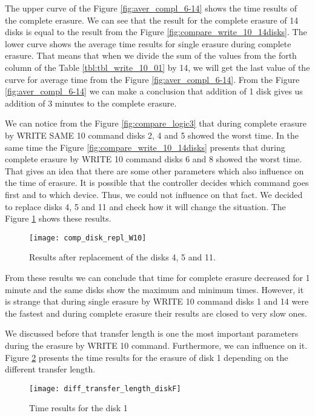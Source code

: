 The upper curve of the Figure \ref{fig:aver_compl_6-14} shows the time results of the complete erasure. We can see that the result for the complete erasure of 14 disks is equal to the result from the Figure \ref{fig:compare_write_10_14disks}. The lower curve shows the average time results for single erasure during complete erasure. That means that when we divide the sum of the values from the forth column of the Table \ref{tbl:tbl_write_10_01} by 14, we will get the last value of the curve for average time from the Figure \ref{fig:aver_compl_6-14}. From the Figure \ref{fig:aver_compl_6-14} we can make a conclusion that addition of 1 disk gives us addition of 3 minutes to the complete erasure.

We can notice from the Figure \ref{fig:compare_logic3} that during complete erasure by WRITE SAME 10 command disks 2, 4 and 5 showed the worst time. In the same time the Figure \ref{fig:compare_write_10_14disks} presents that during complete erasure by WRITE 10 command disks 6 and 8 showed the worst time. That gives an idea that there are some other parameters which also influence on the time of erasure. It is possible that the controller decides which command goes first and to which device. Thus, we could not influence on that fact. We decided to replace disks 4, 5 and 11 and check how it will change the situation. The Figure \ref{fig:comp_disk_repl_W10} shows these results. 

\begin{figure}[h!]
\begin{center}
  \texttt{[image: comp\_disk\_repl\_W10]}
\end{center}
  \caption{Results after replacement of the disks 4, 5 and 11.}
  \label{fig:comp_disk_repl_W10}
\end{figure}

From these results we can conclude that time for complete erasure decreased for 1 minute and the same disks show the maximum and minimum times. However, it is strange that during single erasure by WRITE 10 command disks 1 and 14 were the fastest and during complete erasure their results are closed to very slow ones.

We discussed before that transfer length is one the most important parameters during the erasure by WRITE 10 command. Furthermore, we can influence on it. Figure \ref{fig:diff_transfer_length_diskF} presents the time results for the erasure of disk 1 depending on the different transfer length.

\begin{figure}[h!]
\begin{center}
  \texttt{[image: diff\_transfer\_length\_diskF]}
\end{center}
  \caption{Time results for the disk 1}
  \label{fig:diff_transfer_length_diskF}
\end{figure}

